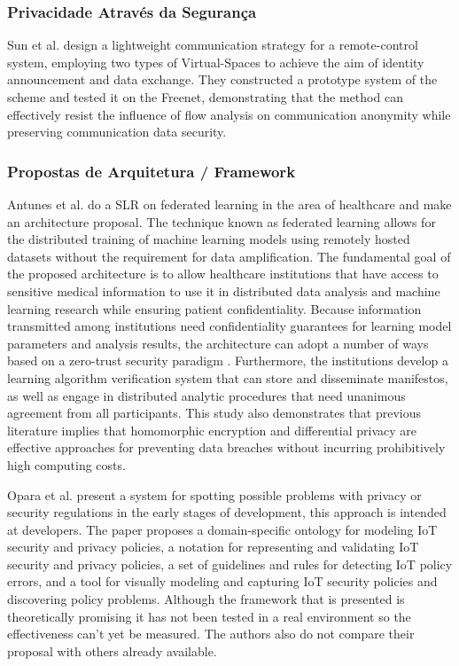 \documentclass[conference]{IEEEtran}
\begin{document}
\subsubsection{Privacidade Através da Segurança}

Sun et al. \cite{SunSecure} design a lightweight communication strategy
for a remote-control system, employing two types of Virtual-Spaces to achieve
the aim of identity announcement and data exchange. They constructed a prototype
system of the scheme and tested it on the Freenet, demonstrating that the
method can effectively resist the influence of flow analysis on communication
anonymity while preserving communication data security.

\subsubsection{Propostas de Arquitetura / Framework}

Antunes et al. \cite{AntunesFederated} do a SLR on federated learning in
the area of healthcare and make an architecture proposal. The technique
known as federated learning allows for the distributed training of machine
learning models using remotely hosted datasets without the requirement for
data amplification. The fundamental goal of the proposed architecture is
to allow healthcare institutions that have access to sensitive medical information
to use it in distributed data analysis and machine learning research while
ensuring patient confidentiality. Because information transmitted among
institutions need confidentiality guarantees for learning model parameters
and analysis results, the architecture can adopt a number of ways based on
a zero-trust security paradigm \cite{ChenSecurity}. Furthermore, the institutions
develop a learning algorithm verification system that can store and disseminate
manifestos, as well as engage in distributed analytic procedures that need
unanimous agreement from all participants. This study also demonstrates
that previous literature implies that homomorphic encryption and differential
privacy are effective approaches for preventing data breaches without incurring
prohibitively high computing costs.

Opara et al. \cite{opara2022framework} present a system for spotting possible
problems with privacy or security regulations in the early stages of development,
this approach is intended at developers. The paper proposes a domain-specific
ontology for modeling IoT security and privacy policies, a notation for
representing and validating IoT security and privacy policies, a set of
guidelines and rules for detecting IoT policy errors, and a tool for visually
modeling and capturing IoT security policies and discovering policy problems.
Although the framework that is presented is theoretically promising it has
not been tested in a real environment so the effectiveness can't yet be
measured. The authors also do not compare their proposal with others already
available.
\end{document}
